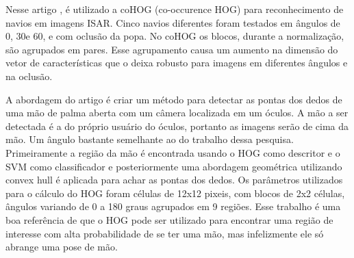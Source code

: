Nesse artigo \cite{kawahara2012automatic}, é utilizado a coHOG (co-occurence HOG) para reconhecimento de navios em imagens ISAR. Cinco navios diferentes foram testados em ângulos de 0\degree, 30\degree e 60\degree, e com oclusão da popa. No coHOG os blocos, durante a normalização, são agrupados em pares. Esse agrupamento causa um aumento na dimensão do vetor de características que o deixa robusto para imagens em diferentes ângulos e na oclusão.


A abordagem do artigo \cite{jiang2012robust} é criar um método para detectar as pontas dos dedos de uma mão de palma aberta com um câmera localizada em um óculos. A mão a ser detectada é a do próprio usuário do óculos, portanto as imagens serão de cima da mão. Um ângulo bastante semelhante ao do trabalho dessa pesquisa. Primeiramente a região da mão é encontrada usando o HOG como descritor e o SVM como classificador e posteriormente uma abordagem geométrica utilizando convex hull é aplicada para achar as pontas dos dedos. Os parâmetros utilizados para o cálculo do HOG foram células de 12x12 pixeis, com blocos de 2x2 células, ângulos variando de 0 a 180 graus agrupados em 9 regiões. Esse trabalho é uma boa referência de que o HOG pode ser utilizado para encontrar uma região de interesse com alta probabilidade de se ter uma mão, mas infelizmente ele só abrange uma pose de mão.


